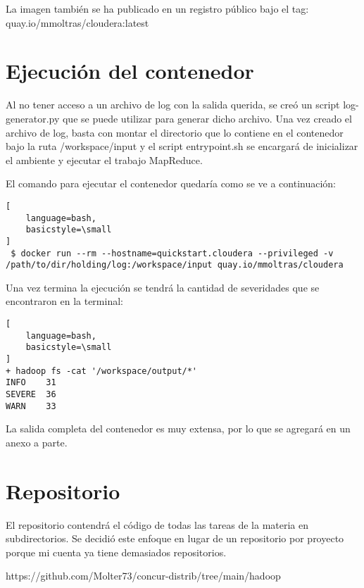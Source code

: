 \documentclass[a4paper]{article}
\begin{document}
La imagen también se ha publicado en un registro público bajo el tag:
quay.io/mmoltras/cloudera:latest

\section{Ejecución del contenedor}

Al no tener acceso a un archivo de log con la salida querida, se creó un script
log-generator.py que se puede utilizar para generar dicho archivo. Una vez
creado el archivo de log, basta con montar el directorio que lo contiene en
el contenedor bajo la ruta /workspace/input y el script entrypoint.sh se
encargará de inicializar el ambiente y ejecutar el trabajo MapReduce.

El comando para ejecutar el contenedor quedaría como se ve a continuación:

\begin{lstlisting}[
    language=bash,
    basicstyle=\small
]
 $ docker run --rm --hostname=quickstart.cloudera --privileged -v /path/to/dir/holding/log:/workspace/input quay.io/mmoltras/cloudera
\end{lstlisting}

Una vez termina la ejecución se tendrá la cantidad de severidades que se
encontraron en la terminal:

\begin{lstlisting}[
    language=bash,
    basicstyle=\small
]
+ hadoop fs -cat '/workspace/output/*'
INFO    31
SEVERE  36
WARN    33
\end{lstlisting}

La salida completa del contenedor es muy extensa, por lo que se agregará en un
anexo a parte.

\section{Repositorio}

El repositorio contendrá el código de todas las tareas de la materia en
subdirectorios. Se decidió este enfoque en lugar de un repositorio por proyecto
porque mi cuenta ya tiene demasiados repositorios.

https://github.com/Molter73/concur-distrib/tree/main/hadoop

\appendix
\end{document}
